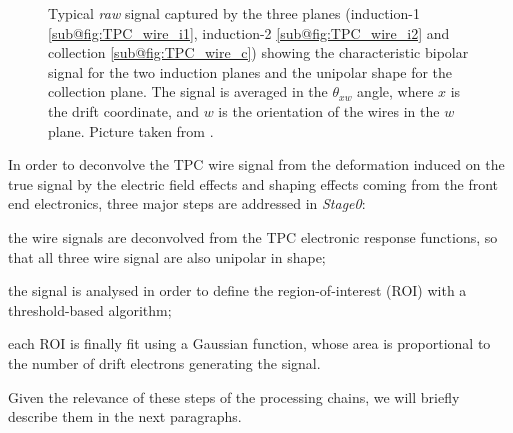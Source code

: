 \begin{figure}
    \centering
    \caption[TPC plane signal]{Typical \emph{raw} signal captured by the three planes (induction-1 \ref{sub@fig:TPC_wire_i1}, induction-2 \ref{sub@fig:TPC_wire_i2} and collection \ref{sub@fig:TPC_wire_c}) showing the characteristic bipolar signal for the two induction planes and the unipolar shape for the collection plane. The signal is averaged in the $\theta_{xw}$ angle, where $x$ is the drift coordinate, and $w$ is the orientation of the wires in the $w$ plane. Picture taken from \cite{ICARUS:2024hmk}. }
    \label{fig:TPC_signal}
\end{figure}

In order to deconvolve the TPC wire signal from the deformation induced on the true signal by the electric field effects and shaping effects coming from the front end electronics, three major steps are addressed in \emph{Stage0}: \begin{inparaenum}
    \item the wire signals are deconvolved from the TPC electronic response functions, so that all three wire signal are also unipolar in shape;
    \item the signal is analysed in order to define the region-of-interest (ROI) with a threshold-based algorithm; 
    \item each ROI is finally fit using a Gaussian function, whose area is proportional to the number of drift electrons generating the signal. 
\end{inparaenum} Given the relevance of these steps of the processing chains, we will briefly describe them in the next paragraphs.

